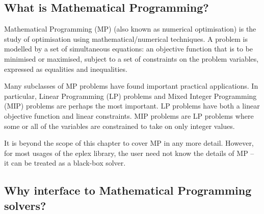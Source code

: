 \subsection{What is Mathematical Programming?}
\label{whatmp}


Mathematical Programming (MP) (also known as numerical optimisation) is the study of optimisation using
mathematical/numerical techniques. A problem is modelled
by a set of simultaneous equations: an
objective function that is to be minimised or maximised, subject to a set of
constraints on the problem variables, expressed as equalities and
inequalities. 

Many subclasses of MP problems have found important practical
applications. In particular, Linear Programming (LP)
problems and Mixed Integer Programming (MIP) problems are perhaps the most
important. LP problems have both a linear objective function and linear
constraints.  MIP problems are LP problems where some or all of the
variables are constrained to take on only integer values. 

It is beyond the scope of this chapter to cover MP in
any more detail. However, for most usages of the eplex library, the user
need not know the details of MP -- it can be treated as a black-box
solver.



\subsection{Why interface to Mathematical Programming solvers?}
\label{whymp}


